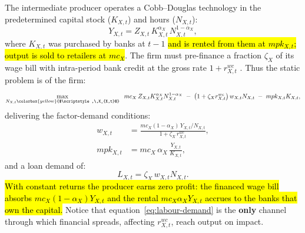 The intermediate producer operates a Cobb--Douglas technology in the predetermined capital stock ($K_{X,t}$) and hours ($N_{X,t}$):
\begin{equation}
Y_{X,t}=Z_{X,t}\,K_{X,t}^{\alpha_X}\,N_{X,t}^{1-\alpha_X},
\label{eq:production}
\end{equation}
where $K_{X,t}$ was purchased by banks at $t-1$ \hl{and is rented from them at $mpk_{X,t}$; output is sold to retailers at $mc_X$}. The firm must pre-finance a fraction $\zeta_X$ of its wage bill with intra-period bank credit at the gross rate $1+r^{wc}_{X,t}$ \citep{neumeyer2005business}. Thus the static problem is of the firm:
\begin{equation}
\max_{N_{X,t}\colorbox{yellow}{$\scriptstyle ,\,K_{X,t}$}}\;\;
mc_X\,Z_{X,t}K_{X,t}^{\alpha_X}N_{X,t}^{1-\alpha_X}
\;-\;\bigl(1+\zeta_X r^{wc}_{X,t}\bigr)\,w_{X,t}N_{X,t}
\;-\;mpk_{X,t}K_{X,t},
\label{eq:firm-problem}
\end{equation}
delivering the factor-demand conditions:
\begin{align}
w_{X,t}&=\frac{mc_X(1-\alpha_X)\,Y_{X,t}/N_{X,t}}{1+\zeta_X\,r^{wc}_{X,t}},
\label{eq:labour-demand}\\[3pt]
mpk_{X,t}&=mc_X\,\alpha_X\,\frac{Y_{X,t}}{K_{X,t}},
\label{eq:mpk}
\end{align}
and a loan demand of:
\begin{equation}
L_{X,t}=\zeta_X\,w_{X,t}N_{X,t}.
\label{eq:loan-demand}
\end{equation}
\hl{With constant returns the producer earns zero profit: the financed wage bill absorbs $mc_X(1-\alpha_X)Y_{X,t}$ and the rental $mc_X\alpha_X Y_{X,t}$ accrues to the banks that own the capital.}
Notice that equation~\eqref{eq:labour-demand} is the \textbf{only} channel through which
financial spreads, affecting $r_{X,t}^{wc}$, reach output on impact.

